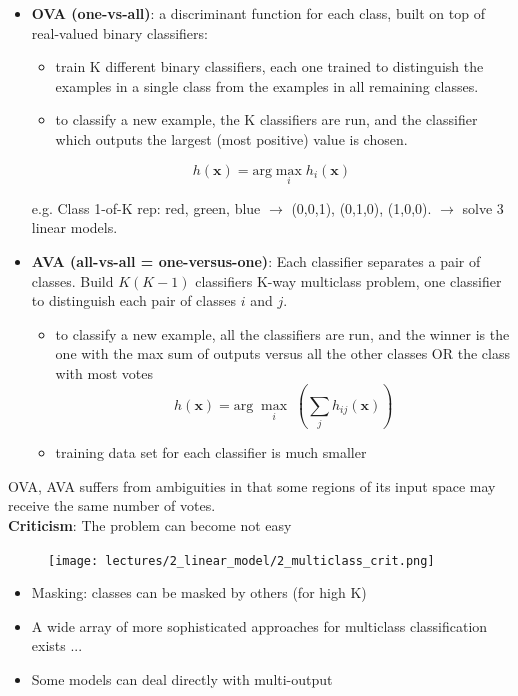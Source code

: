 \documentclass[../main.tex]{subfiles}
\begin{document}
\begin{itemize}
    \item \textbf{OVA (one-vs-all)}: a discriminant function for each class, built on top of real-valued binary classifiers:
    \begin{itemize}
        \item train K different binary classifiers, each one trained to distinguish the examples in a single class from the examples in all remaining classes.
        \item to classify a new example, the K classifiers are run, and the classifier which outputs the largest (most positive) value is chosen.
    \end{itemize}
        $$ h(\mathbf{x}) = \mbox{arg}\max_{i}h_i(\mathbf{x})$$ 

    e.g. Class 1-of-K rep: {red, green, blue} $\rightarrow$ (0,0,1), (0,1,0), (1,0,0). $\rightarrow$ solve 3 linear models.
    
    \item \textbf{AVA (all-vs-all = one-versus-one)}:
    Each classifier separates a pair of classes. Build $K(K-1)$ classifiers K-way multiclass problem, one classifier to distinguish each pair of classes $i$ and $j$.
    \begin{itemize}
        \item to classify a new example, all the classifiers are run, and the winner is the one with the
                max sum of outputs versus all the other classes OR the class with most votes
        $$ h(\mathbf{x}) = \mbox{arg}\;\max_{i} \; (\sum_{j}^{} h_{ij}(\mathbf{x}))$$ 
        \item training data set for each classifier is much smaller
    \end{itemize}
    
\end{itemize}
OVA, AVA suffers from ambiguities in that some regions of its input space may receive the same number of votes.\\

\noindent \textbf{Criticism}:
The problem can become not easy
\begin{figure}[H]
    \centering
    \texttt{[image: lectures/2\_linear\_model/2\_multiclass\_crit.png]}
\end{figure}

\begin{itemize}
    \item Masking: classes can be masked by others (for high K) 
    \item A wide array of more sophisticated approaches for
multiclass classification exists ...
    \item Some models can deal directly with multi-output
\end{itemize}
\end{document}
